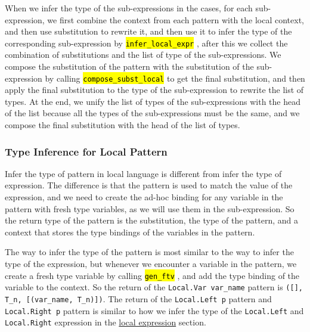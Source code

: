 \documentclass{article}
\newcommand{\highlighttexttt}[2][black]{ %
  \sethlcolor{cyan!10} %
  \texttt{\textcolor{#1}{\hl{#2}}}
}
\begin{document}
\begin{itemize}
                  When we infer the type of the sub-expressions in the cases,
                  for each sub-expression, we first combine the context from each pattern with the local context, and then use substitution to rewrite it,
                  and then use it to infer the type of the corresponding sub-expression by \highlighttexttt{infer\_local\_expr},
                  after this we collect the combination of substitutions and the list of type of the sub-expressions. We compose the substitution of the pattern
                  with the substitution of the sub-expression by calling \highlighttexttt{compose\_subst\_local} to get the final substitution, and then apply the final substitution
                  to the type of the sub-expression to rewrite the list of types. At the end, we unify the list of types of the sub-expressions with the
                  head of the list because all the types of the sub-expressions must be the same, and we compose the final substitution with the head of the list of types.
        \end{itemize}

    \subsubsection{Type Inference for Local Pattern}\label{local_pattern}
        Infer the type of pattern in local language is different from infer the type of expression.
        The difference is that the pattern is used to match the value of the expression, and we need to
        create the ad-hoc binding for any variable in the pattern with fresh type variables, as we will use them in the sub-expression.
        So the return type of the pattern is the substitution, the type of the pattern, and a context that stores the type bindings of the variables in the pattern.

        The way to infer the type of the pattern is most similar to the way to infer the type of the expression,
        but whenever we encounter a variable in the pattern, we create a fresh type variable by calling \highlighttexttt{gen\_ftv},
        and add the type binding of the variable to the context. So the return of the \texttt{Local.Var var\_name} pattern is
        \texttt{([], T\_n, [(var\_name, T\_n)])}. The return of the \texttt{Local.Left p} pattern and \texttt{Local.Right p} pattern is similar to
        how we infer the type of the \texttt{Local.Left} and \texttt{Local.Right} expression in the \hyperref[local_expr]{local expression} section.
\end{document}
